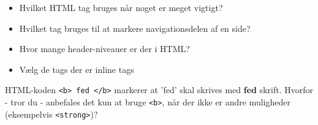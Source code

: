 \begin{itemize}
\item Hvilket HTML tag bruges når noget er meget vigtigt?
\begin{answerspot}
  \begin{multchoice}
      
  \end{multchoice}
\end{answerspot}

\item Hvilket tag bruges til at markere navigationsdelen af en side?  
  \begin{answerspot}
    \begin{multchoice}
    \end{multchoice}
  \end{answerspot}
\item Hvor mange header-niveauer er der i HTML?
    \begin{answerspot}
    \begin{multchoice}
      
    \end{multchoice}
  \end{answerspot}
  
\item Vælg de tags der er inline tags
    \begin{answerspot}
    \begin{multchoice}
    \end{multchoice}
  \end{answerspot}
\end{itemize}

HTML-koden \lstinline{<b> fed </b>}  markerer at 'fed' skal skrives
med \textbf{fed} skrift. Hvorfor - tror du -  anbefales det kun at
bruge \lstinline{<b>}, når der ikke er andre muligheder (eksempelvis \lstinline{<strong>})?

\begin{answerspot}
  \makeTextField[3cm]
\end{answerspot}



